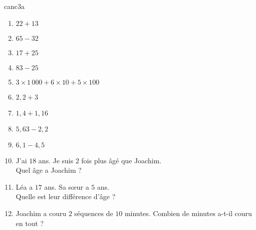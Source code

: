 \begin{EXO}{}{canc3a}
    
\begin{multicols}{2}
\begin{enumerate}[itemsep=1em, label=\arabic*)]
	\item {}\begin{minipage}[t]{\linewidth} $22+13$ \end{minipage}
	\item {}\begin{minipage}[t]{\linewidth} $65-32$ \end{minipage}
	\item {}\begin{minipage}[t]{\linewidth} $17+25$ \end{minipage}
	\item {}\begin{minipage}[t]{\linewidth} $83-25$ \end{minipage}
	\item {}\begin{minipage}[t]{\linewidth} $3\times 1\,000 + 6\times 10 + 5\times 100$ \end{minipage}
	\item {}\begin{minipage}[t]{\linewidth} $2{,}2+3$ \end{minipage}
	\item {}\begin{minipage}[t]{\linewidth} $1{,}4+1{,}16$ \end{minipage}
	\item {}\begin{minipage}[t]{\linewidth} $5{,}63-2{,}2$ \end{minipage}
	\item {}\begin{minipage}[t]{\linewidth} $6{,}1-4{,}5$ \end{minipage}
	\item {}\begin{minipage}[t]{\linewidth} J'ai $18$ ans. Je suis $2$ fois plus âgé que Joachim.\\Quel âge a Joachim ? \end{minipage}
	\item {}\begin{minipage}[t]{\linewidth} Léa a $17$ ans. Sa sœur a $5$ ans.\\Quelle est leur différence d'âge ? \end{minipage}
	\item {}\begin{minipage}[t]{\linewidth} Joachim a couru $2$ séquences de $10$ minutes. Combien de minutes a-t-il couru en tout ? \end{minipage}

\end{enumerate}
\end{multicols}
\end{EXO}
